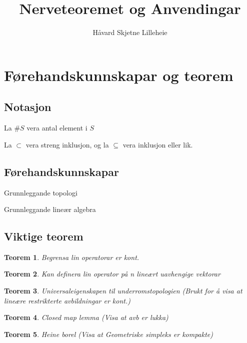 \documentclass[a4paper, titlepage, 12pt, norsk]{article}
\title{Nerveteoremet og Anvendingar}
\author{Håvard Skjetne Lilleheie}
\theoremstyle{plain}
\newtheorem{theorem}{Teorem}[section]
\theoremstyle{definition}
\begin{document}
\maketitle

\section{Førehandskunnskapar og teorem}

\subsection{Notasjon}

La \( \#S \) vera antal element i \( S \)

La \( \subset \) vera streng inklusjon, og la \( \subseteq \) vera inklusjon eller lik.

\subsection{Førehandskunnskapar}

Grunnleggande topologi

Grunnleggande lineær algebra

\subsection{Viktige teorem}

\begin{theorem} \label{thm:begrensa-lin-op-er-kont}
	Begrensa lin operatorar er kont.
\end{theorem}

\begin{theorem} \label{thm:definer-lin-op}
	Kan definera lin operator på n lineært uavhengige vektorar
\end{theorem}

\begin{theorem} \label{thm:universal-eigenskap-underromstopologi}
	Universaleigenskapen til underromstopologien (Brukt for å visa at lineære restrikterte avbildningar er kont.)
\end{theorem}

\begin{theorem} \label{thm:closed-map-lemma}
	Closed map lemma (Visa at avb er lukka)
\end{theorem}

\begin{theorem} \label{thm:heine-borel}
	Heine borel (Visa at Geometriske simpleks er kompakte)
\end{theorem}
\end{document}
